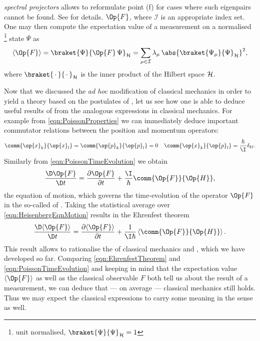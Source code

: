 \begin{enumerate}[label=(\alph*)]
{		\textit{spectral projectors} allows to reformulate point (f) for cases
		where such eigenpairs cannot be found.
		See \cite{Helffer2013} for details.}
		$\Op{F}$, where $\mathcal{I}$ is an appropriate index set.
		One may then compute the expectation value of a measurement
		on a normalised%
		\footnote{unit normalised, \ie $\braket{\Psi}{\Psi}_\hilbert = 1$}
		state $\Psi$ as
		\begin{equation}
			\langle \Op{F} \rangle
				= \braket{\Psi}{\Op{F} \, \Psi}_\hilbert
				= \sum_{\mu\in\mathcal{I}} \lambda_\mu \,
							\abs{\braket{\Psi_\mu}{\Psi}_\hilbert}^2,
			\label{eqn:QMExpectation}
		\end{equation}
		where $\braket{\slot}{\slot}_\hilbert$ is the inner product
		of the Hilbert space $\mathcal{H}$.
\end{enumerate}
Now that we discussed the \textit{ad hoc} modification of classical mechanics
in order to yield a theory based on the postulates of \QM,
let us see how one is able to deduce useful results of \QM
from the analogous expressions in classical mechanics.
For example from \eqref{eqn:PoissonProperties} we can immediately
deduce important commutator relations between the position and momentum operators:
\begin{align}
	\comm{\op{x}_k}{\op{x}_l} &= \comm{\op{p}_k}{\op{p}_l} = 0 & \comm{\op{x}_k}{\op{p}_l} = \frac{\hbar}{\I} \delta_{kl}.
	\label{eqn:compatibilityOperator}
\end{align}
Similarly from \eqref{eqn:PoissonTimeEvolution} we obtain
\begin{equation}
	\frac{\D \Op{F}}{\D t} = \frac{\partial \Op{F}}{\partial t} + \frac{\I}{\hbar} \comm{\Op{F}}{\Op{H}},
	\label{eqn:HeisenbergEqnMotion}
\end{equation}
the equation of motion, which governs the time-evolution of the operator $\Op{F}$
in the so-called  of \QM.
Taking the statistical average over \eqref{eqn:HeisenbergEqnMotion}
results in the Ehrenfest theorem
\begin{equation}
	\frac{\D \langle \Op{F} \rangle}{\D t} = \frac{\partial \langle \Op{F} \rangle}{\partial t} + \frac{1}{\I \hbar} \left\langle \comm{\Op{F}}{\Op{H}} \right\rangle.
	\label{eqn:EhrenfestTheorem}
\end{equation}
This result allows to rationalise the 
of classical mechanics and \QM,
which we have developed so far.
Comparing \eqref{eqn:EhrenfestTheorem} and \eqref{eqn:PoissonTimeEvolution}
and keeping in mind that the expectation value $\langle \Op{F} \rangle$
as well as the classical observable $F$ both tell us about the result
of a measurement,
we can deduce that --- on average --- classical mechanics still holds.
Thus we may expect the classical expressions to carry some meaning
in the \QM sense as well.

